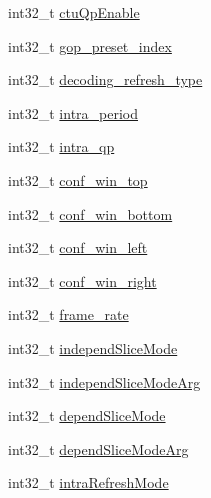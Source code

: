 \begin{DoxyCompactItemize}
int32\+\_\+t \mbox{\hyperlink{struct__ni__encoder__change__params__t_a392fb808de2aaab7d0e5a459e804b5e2}{ctu\+Qp\+Enable}}
\item 
int32\+\_\+t \mbox{\hyperlink{struct__ni__encoder__change__params__t_ab0b73cbef66b6ba4166889a36bb20d4a}{gop\+\_\+preset\+\_\+index}}
\item 
int32\+\_\+t \mbox{\hyperlink{struct__ni__encoder__change__params__t_a536cda1521aab86fe11a8af60dfba81b}{decoding\+\_\+refresh\+\_\+type}}
\item 
int32\+\_\+t \mbox{\hyperlink{struct__ni__encoder__change__params__t_ac5dad8bef407cf664f56517a7b39e424}{intra\+\_\+period}}
\item 
int32\+\_\+t \mbox{\hyperlink{struct__ni__encoder__change__params__t_a02161a1953a870e2b5dcf24c1bef3d10}{intra\+\_\+qp}}
\item 
int32\+\_\+t \mbox{\hyperlink{struct__ni__encoder__change__params__t_ab6956f53cb5a13e13bae34ebc7191735}{conf\+\_\+win\+\_\+top}}
\item 
int32\+\_\+t \mbox{\hyperlink{struct__ni__encoder__change__params__t_a9797f2600ca1736cf53756aab35a84aa}{conf\+\_\+win\+\_\+bottom}}
\item 
int32\+\_\+t \mbox{\hyperlink{struct__ni__encoder__change__params__t_a861b75deb87d0311ab713c372a89c3db}{conf\+\_\+win\+\_\+left}}
\item 
int32\+\_\+t \mbox{\hyperlink{struct__ni__encoder__change__params__t_a997a7dfa78ea00ad507e5602b591d18e}{conf\+\_\+win\+\_\+right}}
\item 
int32\+\_\+t \mbox{\hyperlink{struct__ni__encoder__change__params__t_a729fea7e7e39ba5c309e5289844bb285}{frame\+\_\+rate}}
\item 
int32\+\_\+t \mbox{\hyperlink{struct__ni__encoder__change__params__t_a30a01a8c46d70e118ff75abc8b5e3014}{independ\+Slice\+Mode}}
\item 
int32\+\_\+t \mbox{\hyperlink{struct__ni__encoder__change__params__t_a5410e44e3af2b66682101df91d419bc0}{independ\+Slice\+Mode\+Arg}}
\item 
int32\+\_\+t \mbox{\hyperlink{struct__ni__encoder__change__params__t_ab8e0ef7bdea29cbeb8cafb61dab9c65a}{depend\+Slice\+Mode}}
\item 
int32\+\_\+t \mbox{\hyperlink{struct__ni__encoder__change__params__t_a418194649eee2e58f35a84e155b9d02f}{depend\+Slice\+Mode\+Arg}}
\item 
int32\+\_\+t \mbox{\hyperlink{struct__ni__encoder__change__params__t_a653491351aa4ed441635561e032455b8}{intra\+Refresh\+Mode}}
\item 

\end{DoxyCompactItemize}
